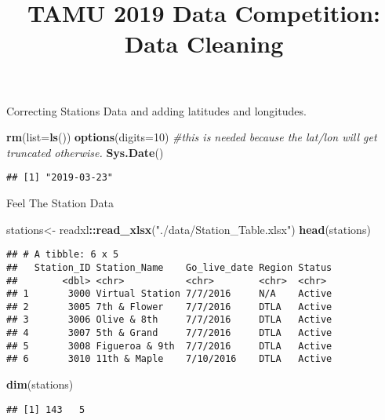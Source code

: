 \documentclass[]{article}
\title{TAMU 2019 Data Competition: Data Cleaning}
\author{}
\date{}
\newenvironment{Shaded}{\begin{snugshade}}{\end{snugshade}}
\newcommand{\KeywordTok}[1]{\textcolor[rgb]{0.13,0.29,0.53}{\textbf{#1}}}
\newcommand{\DataTypeTok}[1]{\textcolor[rgb]{0.13,0.29,0.53}{#1}}
\newcommand{\DecValTok}[1]{\textcolor[rgb]{0.00,0.00,0.81}{#1}}
\newcommand{\StringTok}[1]{\textcolor[rgb]{0.31,0.60,0.02}{#1}}
\newcommand{\CommentTok}[1]{\textcolor[rgb]{0.56,0.35,0.01}{\textit{#1}}}
\newcommand{\OperatorTok}[1]{\textcolor[rgb]{0.81,0.36,0.00}{\textbf{#1}}}
\newcommand{\NormalTok}[1]{#1}
\begin{document}
\maketitle

Correcting Stations Data and adding latitudes and longitudes.

\begin{Shaded}
\begin{Highlighting}[]
\KeywordTok{rm}\NormalTok{(}\DataTypeTok{list=}\KeywordTok{ls}\NormalTok{())}
\KeywordTok{options}\NormalTok{(}\DataTypeTok{digits=}\DecValTok{10}\NormalTok{) }\CommentTok{#this is needed because the lat/lon will get truncated otherwise.}
\KeywordTok{Sys.Date}\NormalTok{()}
\end{Highlighting}
\end{Shaded}

\begin{verbatim}
## [1] "2019-03-23"
\end{verbatim}

Feel The Station Data

\begin{Shaded}
\begin{Highlighting}[]
\NormalTok{stations<-}\StringTok{ }\NormalTok{readxl}\OperatorTok{::}\KeywordTok{read_xlsx}\NormalTok{(}\StringTok{"./data/Station_Table.xlsx"}\NormalTok{)}
\KeywordTok{head}\NormalTok{(stations)}
\end{Highlighting}
\end{Shaded}

\begin{verbatim}
## # A tibble: 6 x 5
##   Station_ID Station_Name    Go_live_date Region Status
##        <dbl> <chr>           <chr>        <chr>  <chr> 
## 1       3000 Virtual Station 7/7/2016     N/A    Active
## 2       3005 7th & Flower    7/7/2016     DTLA   Active
## 3       3006 Olive & 8th     7/7/2016     DTLA   Active
## 4       3007 5th & Grand     7/7/2016     DTLA   Active
## 5       3008 Figueroa & 9th  7/7/2016     DTLA   Active
## 6       3010 11th & Maple    7/10/2016    DTLA   Active
\end{verbatim}

\begin{Shaded}
\begin{Highlighting}[]
\KeywordTok{dim}\NormalTok{(stations)}
\end{Highlighting}
\end{Shaded}

\begin{verbatim}
## [1] 143   5
\end{verbatim}
\end{document}
